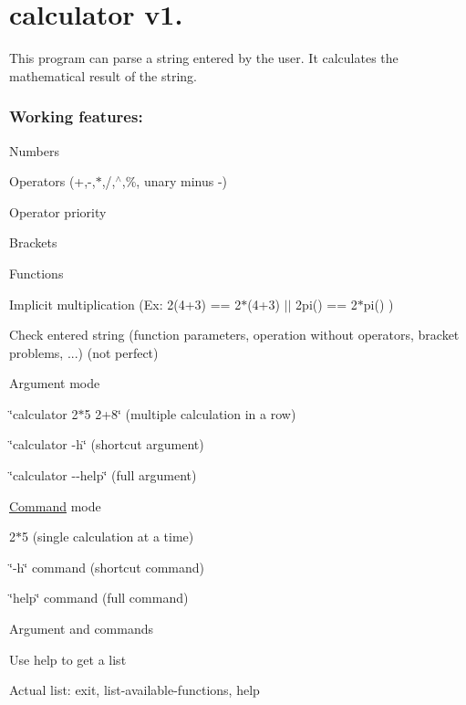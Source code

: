 \section*{calculator v1.}

This program can parse a string entered by the user. It calculates the mathematical result of the string.

\subsubsection*{Working features\+:}


\begin{DoxyItemize}
\item Numbers
\item Operators (+,-\/,$\ast$,/,$^\wedge$,\%, unary minus -\/)
\item Operator priority
\item Brackets
\item Functions
\item Implicit multiplication (Ex\+: 2(4+3) == 2$\ast$(4+3) $\vert$$\vert$ 2pi() == 2$\ast$pi() )
\item Check entered string (function parameters, operation without operators, bracket problems, ...) (not perfect)
\item Argument mode
\begin{DoxyItemize}
\item \char`\"{}calculator 2$\ast$5 2+8\char`\"{} (multiple calculation in a row)
\item \char`\"{}calculator -\/h\char`\"{} (shortcut argument)
\item \char`\"{}calculator -\/-\/help\char`\"{} (full argument)
\end{DoxyItemize}
\item \hyperlink{class_command}{Command} mode
\begin{DoxyItemize}
\item 2$\ast$5 (single calculation at a time)
\item \char`\"{}-\/h\char`\"{} command (shortcut command)
\item \char`\"{}help\char`\"{} command (full command)
\end{DoxyItemize}
\item Argument and commands
\begin{DoxyItemize}
\item Use help to get a list
\item Actual list\+: exit, list-\/available-\/functions, help
\end{DoxyItemize}
\end{DoxyItemize}

